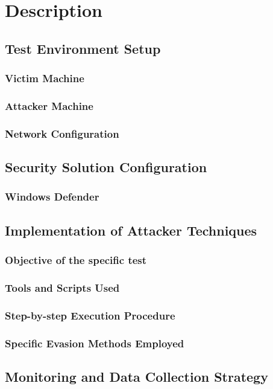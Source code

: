 \documentclass[11pt]{article}
\begin{document}
		\section{Description}
			\subsection{Test Environment Setup}
				\subsubsection{Victim Machine}
				\subsubsection{Attacker Machine}
				\subsubsection{Network Configuration}
			\subsection{Security Solution Configuration}
				\subsubsection{Windows Defender}
			\subsection{Implementation of Attacker Techniques}
				\subsubsection{Objective of the specific test}
				\subsubsection{Tools and Scripts Used}
				\subsubsection{Step-by-step Execution Procedure}
				\subsubsection{Specific Evasion Methods Employed}
			\subsection{Monitoring and Data Collection Strategy}
\end{document}
